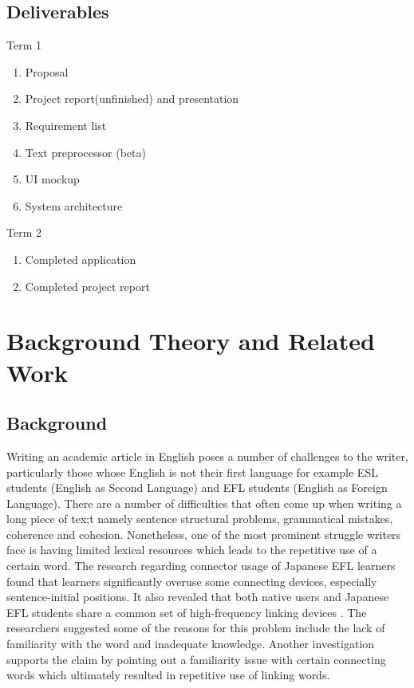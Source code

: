 \documentclass[12pt,oneside,openright,a4paper]{cpe-english-project}
\begin{document}
\section{Deliverables}
Term 1
\begin{enumerate}
\item Proposal
\item Project report(unfinished) and presentation
\item Requirement list
\item Text preprocessor (beta)
\item UI mockup
\item System architecture\\
\end{enumerate}

Term 2
\begin{enumerate}
\item Completed application
\item Completed project report
\end{enumerate}


\chapter{Background Theory and Related Work}
\section{Background}
Writing an academic article in English poses a number of challenges to the writer, particularly those whose English is not their first language for example ESL students (English as Second Language) and EFL students (English as Foreign Language). There are a number of difficulties that often come up when writing a long piece of tex;t namely sentence structural problems, grammatical mistakes, coherence and cohesion. Nonetheless, one of the most prominent struggle writers face is having limited lexical resources which leads to the repetitive use of a certain word. The research regarding connector usage of Japanese EFL learners found that learners significantly overuse some connecting devices, especially sentence-initial positions. It also revealed that both native users and Japanese EFL students share a common set of high-frequency linking devices \cite{v}. The researchers suggested some of the reasons for this problem include the lack of familiarity with the word and inadequate knowledge. Another investigation \cite{w} supports the claim by pointing out a familiarity issue with certain connecting words which ultimately resulted in repetitive use of linking words. 
\end{document}

